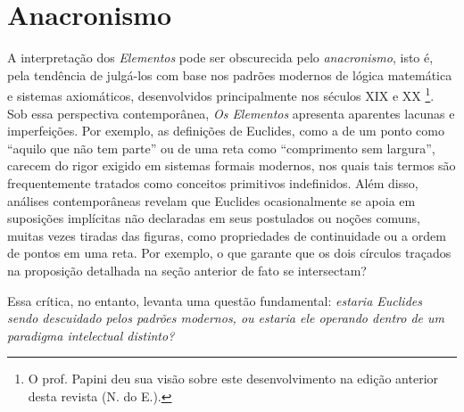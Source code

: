 \documentclass{hipatia}
\begin{document}

\section{Anacronismo}

A interpretação dos \emph{Elementos} pode ser obscurecida
pelo \emph{anacronismo}, isto é, pela tendência de
julgá-los com base nos padrões modernos de lógica
matemática e sistemas axiomáticos, desenvolvidos
principalmente nos séculos XIX e XX \footnote{
O prof. Papini deu sua visão sobre este 
desenvolvimento na edição anterior desta revista
\cite{Papini2024} (N. do E.).}. Sob essa
perspectiva contemporânea, \emph{Os Elementos} apresenta
aparentes lacunas e imperfeições. Por exemplo, as definições de
Euclides, como a de um ponto como ``aquilo que não
tem parte'' ou de uma reta como ``comprimento sem
largura'', carecem do rigor exigido em sistemas
formais modernos, nos quais tais termos são
frequentemente tratados como conceitos primitivos
indefinidos. Além disso, análises contemporâneas
revelam que Euclides ocasionalmente se apoia em
suposições implícitas não declaradas em seus
postulados ou noções comuns, muitas vezes 
tiradas das figuras, como propriedades de
continuidade ou a ordem de pontos em uma reta. 
Por exemplo, o que garante que os dois círculos 
traçados na proposição detalhada na seção anterior 
de fato se intersectam?

Essa crítica, no entanto, levanta uma questão fundamental:
\emph{estaria Euclides sendo descuidado pelos padrões modernos, ou
estaria ele operando dentro de um paradigma intelectual
distinto?}
\end{document}
